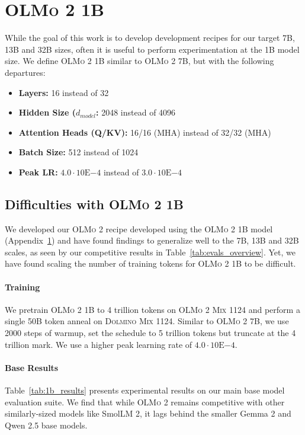 \documentclass[table]{ai2style/ai2}
\newcommand{\olmotoo}{\textsc{OLMo 2}\xspace}
\newcommand{\olmomix}{\textsc{OLMo 2 Mix 1124}\xspace}
\newcommand{\dolminos}{\textsc{Dolmino Mix 1124}\xspace}
\begin{document}
\section{\olmotoo 1B}
\label{app:1b}

While the goal of this work is to develop development recipes for our target 7B, 13B and 32B sizes, often it is useful to perform experimentation at the 1B model size. We define \olmotoo 1B similar to \olmotoo 7B, but with the following departures:
\begin{itemize}
    \item \textbf{Layers:} 16 instead of 32
    \item \textbf{Hidden Size ($d_{model}$: } 2048 instead of 4096
    \item \textbf{Attention Heads (Q/KV): } 16/16 (MHA) instead of 32/32 (MHA)
    \item \textbf{Batch Size: } 512 instead of 1024
    \item \textbf{Peak LR: } $4.0 \cdot 10\text{E}{-4}$ instead of $3.0 \cdot 10\text{E}{-4}$
\end{itemize}

\subsection{Difficulties with \olmotoo 1B}
\label{app:1b-results}

We developed our \olmotoo recipe developed using the \olmotoo 1B model (Appendix~\ref{app:1b}) and have found findings to generalize well to the 7B, 13B and 32B scales, as seen by our competitive results in Table~\ref{tab:evals_overview}.
Yet, we have found scaling the number of training tokens for \olmotoo 1B to be difficult.

\paragraph{Training} We pretrain \olmotoo 1B to 4 trillion tokens on \olmomix and perform a single 50B token anneal on \dolminos. 
Similar to \olmotoo 7B, we use 2000 steps of warmup, set the schedule to 5 trillion tokens but truncate at the 4 trillion mark. We use a higher peak learning rate of $4.0 \cdot 10\text{E}{-4}$.

\paragraph{Base Results} Table~\ref{tab:1b_results} presents experimental results on our main base model evaluation suite. We find that while \olmotoo remains competitive with other similarly-sized models like SmolLM 2, it lags behind the smaller Gemma 2 and Qwen 2.5 base models. 
\end{document}
